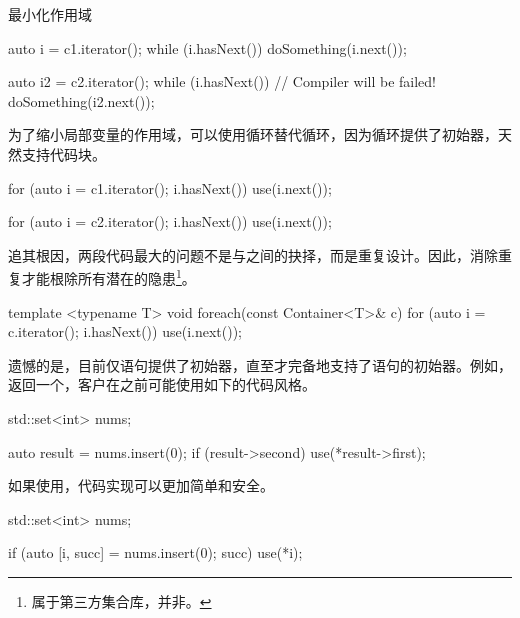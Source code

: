 \begin{content}
\begin{episode}{最小化作用域}
\begin{content}
 \begin{c++}[title={\ttfamily{while循环}}]
{
  auto i = c1.iterator();
  while (i.hasNext()) {
    doSomething(i.next());
  }
}

{
  auto i2 = c2.iterator();
  while (i.hasNext()) {           // Compiler will be failed!
    doSomething(i2.next());
  }
}
 \end{c++}

为了缩小局部变量的作用域，可以使用循环替代循环，因为循环提供了初始器，天然支持代码块。

 \begin{c++}[title={\ttfamily{for循环}}]
for (auto i = c1.iterator(); i.hasNext()) {
  use(i.next());
}

for (auto i = c2.iterator(); i.hasNext()) {
  use(i.next());
}
 \end{c++}

追其根因，两段代码最大的问题不是与之间的抉择，而是重复设计。因此，消除重复才能根除所有潜在的隐患\footnote{属于第三方集合库，并非。}。

 \begin{c++}[title={\ttfamily{for循环}}]
template <typename T>
void foreach(const Container<T>& c) {
  for (auto i = c.iterator(); i.hasNext()) {
    use(i.next());
  } 
}
 \end{c++}

遗憾的是，目前仅语句提供了初始器，直至才完备地支持了语句的初始器。例如，返回一个，客户在之前可能使用如下的代码风格。

 \begin{c++}[title={\ttfamily{插入元素：C++17之前}}]
std::set<int> nums;

auto result = nums.insert(0);
if (result->second) {
  use(*result->first);
}
 \end{c++}

如果使用，代码实现可以更加简单和安全。

 \begin{c++}[title={\ttfamily{插入元素：if初始化器与结构性绑定，C++17}}]
std::set<int> nums;

if (auto [i, succ] = nums.insert(0); succ) {
  use(*i);
}
 \end{c++}

\end{content}

\end{episode}


\end{content}
